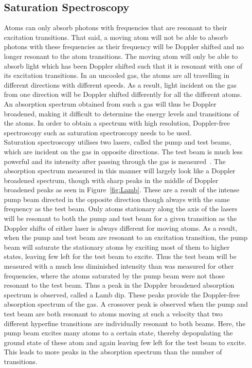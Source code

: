 \documentclass[twocolumn]{article}
\begin{document}
\subsection{Saturation Spectroscopy}
Atoms can only absorb photons with frequencies that are resonant to their excitation transitions. That said, a moving atom will not be able to absorb photons with these frequencies as their frequency will be Doppler shifted and no longer resonant to the atom transitions. The moving atom will only be able to absorb light which has been Doppler shifted such that it is resonant with one of its excitation transitions. In an uncooled gas, the atoms are all travelling in different directions with different speeds. As a result, light incident on the gas from one direction will be Doppler shifted differently for all the different atoms. An absorption spectrum obtained from such a gas will thus be Doppler broadened, making it difficult to determine the energy levels and transitions of the atoms. In order to obtain a spectrum with high resolution, Doppler-free spectroscopy such as saturation spectroscopy needs to be used. \\
Saturation spectroscopy utilises two lasers, called the pump and test beams, which are incident on the gas in opposite directions. The test beam is much less powerful and its intensity after passing through the gas is measured~\cite{manual}. The absorption spectrum measured in this manner will largely look like a Doppler broadened spectrum, though with sharp peaks in the middle of Doppler broadened peaks as seen in Figure~\ref{fig:Lamb}. These are a result of the intense pump beam directed in the opposite direction though always with the same frequency as the test beam. Only atoms stationary along the axis of the lasers will be resonant to both the pump and test beam for a given transition as the Doppler shifts of either laser is always different for moving atoms. As a result, when the pump and test beam are resonant to an excitation transition, the pump beam will saturate the stationary atoms by exciting most of them to higher states, leaving few left for the test beam to excite. Thus the test beam will be measured with a much less diminished intensity than was measured for other frequencies, where the atoms saturated by the pump beam were not those resonant to the test beam. Thus a peak in the Doppler broadened absorption spectrum is observed, called a Lamb dip. These peaks provide the Doppler-free absorption spectrum of the gas. A crossover peak is observed when the pump and test beam are both resonant to atoms moving at such a velocity that two different hyperfine transitions are individually resonant to both beams. Here, the pump beam excites many atoms to a certain state, thereby depopulating the ground state of these atom and again leaving few left for the test beam to excite. This leads to more peaks in the absorption spectrum than the number of transitions.
\end{document}
